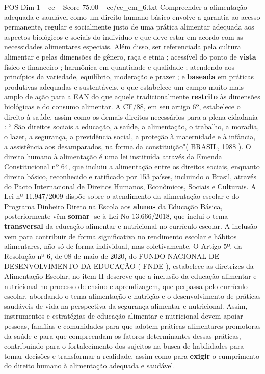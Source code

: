 \begin{textsample}{POS Dim 1 – ce – Score 75.00 – ce/ce\_em\_6.txt}
Compreender a alimentação adequada e saudável como um direito humano básico envolve a garantia ao acesso permanente, regular e socialmente justo de uma prática alimentar adequada aos aspectos biológicos e sociais do indivíduo e que deve estar em acordo com as necessidades alimentares especiais.
Além disso, ser referenciada pela cultura alimentar e pelas dimensões de gênero, raça e etnia ; acessível do ponto de \textbf{vista} físico e financeiro ; harmônica em quantidade e qualidade ; atendendo aos princípios da variedade, equilíbrio, moderação e prazer ; e \textbf{baseada} em práticas produtivas adequadas e sustentáveis, o que estabelece um campo muito mais amplo de ação para a EAN do que aquele tradicionalmente \textbf{restrito} às dimensões biológicas e do consumo alimentar.
A CF/88, em seu artigo 6º, estabelece o direito à saúde, assim como os demais direitos necessários para a plena cidadania : “ São direitos sociais a educação, a saúde, a alimentação, o trabalho, a moradia, o lazer, a segurança, a previdência social, a proteção à maternidade e à infância, a assistência aos desamparados, na forma da constituição"( BRASIL, 1988 ).
O direito humano à alimentação é uma lei instituída através da Emenda Constitucional nº 64, que incluiu a alimentação entre os direitos sociais, enquanto direito básico, reconhecido e ratificado por 153 países, incluindo o Brasil, através do Pacto Internacional de Direitos Humanos, Econômicos, Sociais e Culturais.
A Lei nº 11.947/2009 dispõe sobre o atendimento da alimentação escolar e do Programa Dinheiro Direto na Escola aos \textbf{alunos} da Educação Básica, posteriormente vêm \textbf{somar} -se à Lei No 13.666/2018, que inclui o tema \textbf{transversal} da educação alimentar e nutricional no currículo escolar.
A inclusão vem para contribuir de forma significativa no rendimento escolar e hábitos alimentares, não só de forma individual, mas coletivamente.
O Artigo 5º, da Resolução nº 6, de 08 de maio de 2020, do FUNDO NACIONAL DE DESENVOLVIMENTO DA EDUCAÇÃO ( FNDE ), estabelece as diretrizes da Alimentação Escolar, no item II descreve que a inclusão da educação alimentar e nutricional no processo de ensino e aprendizagem, que perpassa pelo currículo escolar, abordando o tema alimentação e nutrição e o desenvolvimento de práticas saudáveis de vida na perspectiva da segurança alimentar e nutricional.
Assim, instrumentos e estratégias de educação alimentar e nutricional devem apoiar pessoas, famílias e comunidades para que adotem práticas alimentares promotoras da saúde e para que compreendam os fatores determinantes dessas práticas, contribuindo para o fortalecimento dos sujeitos na busca de habilidades para tomar decisões e transformar a realidade, assim como para \textbf{exigir} o cumprimento do direito humano à alimentação adequada e saudável.

\end{textsample}
